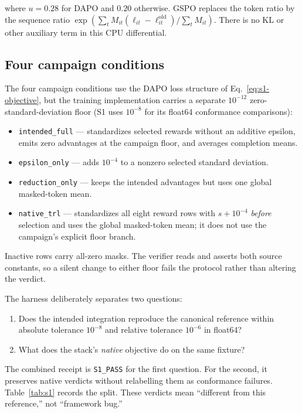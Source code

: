 where $u=0.28$ for DAPO and $0.20$ otherwise. GSPO replaces the token ratio by
the sequence ratio
$\exp(\sum_t M_{it}(\ell_{it}-\ell^{\mathrm{old}}_{it})/\sum_t M_{it})$. There
is no KL or other auxiliary term in this CPU differential.

\subsection{Four campaign conditions}

The four campaign conditions use the DAPO loss structure of
Eq.~\eqref{eq:s1-objective}, but the training implementation carries a separate
$10^{-12}$ zero-standard-deviation floor (S1 uses $10^{-8}$ for its float64
conformance comparisons):

\begin{itemize}[leftmargin=1.4em,itemsep=2pt]
  \item \texttt{intended\_full} --- standardizes selected rewards without an
  additive epsilon, emits zero advantages at the campaign floor, and averages
  completion means.
  \item \texttt{epsilon\_only} --- adds $10^{-4}$ to a nonzero selected standard
  deviation.
  \item \texttt{reduction\_only} --- keeps the intended advantages but uses one
  global masked-token mean.
  \item \texttt{native\_trl} --- standardizes all eight reward rows with
  $s+10^{-4}$ \emph{before} selection and uses the global masked-token mean; it
  does not use the campaign's explicit floor branch.
\end{itemize}

Inactive rows carry all-zero masks. The verifier reads and asserts both source
constants, so a silent change to either floor fails the protocol rather than
altering the verdict.

The harness deliberately separates two questions:

\begin{enumerate}[leftmargin=1.6em,itemsep=3pt]
  \item Does the intended integration reproduce the canonical reference within
  absolute tolerance $10^{-8}$ and relative tolerance $10^{-6}$ in float64?
  \item What does the stack's \emph{native} objective do on the same fixture?
\end{enumerate}

The combined receipt is \texttt{S1\_PASS} for the first question. For the second,
it preserves native verdicts without relabelling them as conformance failures.
Table~\ref{tab:s1} records the split. These verdicts mean ``different from this
reference,'' not ``framework bug.''

